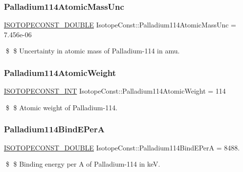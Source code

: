 \subsubsection{\texorpdfstring{Palladium114\+Atomic\+Mass\+Unc}{Palladium114AtomicMassUnc}}
{\footnotesize\ttfamily \mbox{\hyperlink{group___isotope_const-_macros_ga8f45a7272ce02c0b4c65c44636ed719a}{I\+S\+O\+T\+O\+P\+E\+C\+O\+N\+S\+T\+\_\+\+D\+O\+U\+B\+LE}} Isotope\+Const\+::\+Palladium114\+Atomic\+Mass\+Unc = 7.\+456e-\/06}

\$ \$ Uncertainty in atomic mass of Palladium-\/114 in amu. \mbox{\label{group___isotope_const-_palladium-_pd114_gafc3263de0b793a142391cb0592be9fb5}} 
\subsubsection{\texorpdfstring{Palladium114\+Atomic\+Weight}{Palladium114AtomicWeight}}
{\footnotesize\ttfamily \mbox{\hyperlink{group___isotope_const-_macros_ga5f18360b3e99483a35c32d789e62621c}{I\+S\+O\+T\+O\+P\+E\+C\+O\+N\+S\+T\+\_\+\+I\+NT}} Isotope\+Const\+::\+Palladium114\+Atomic\+Weight = 114}

\$ \$ Atomic weight of Palladium-\/114. \mbox{\label{group___isotope_const-_palladium-_pd114_ga55c45977a0fed59163f0f53c67ed796d}} 
\subsubsection{\texorpdfstring{Palladium114\+Bind\+E\+PerA}{Palladium114BindEPerA}}
{\footnotesize\ttfamily \mbox{\hyperlink{group___isotope_const-_macros_ga8f45a7272ce02c0b4c65c44636ed719a}{I\+S\+O\+T\+O\+P\+E\+C\+O\+N\+S\+T\+\_\+\+D\+O\+U\+B\+LE}} Isotope\+Const\+::\+Palladium114\+Bind\+E\+PerA = 8488.}

\$ \$ Binding energy per A of Palladium-\/114 in keV. \mbox{\label{group___isotope_const-_palladium-_pd114_ga860eb58d8a03ca58ad0cdffaa052f481}} 
